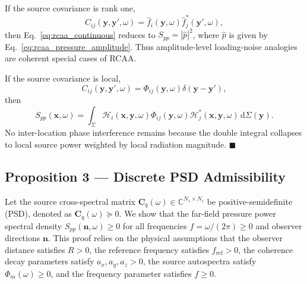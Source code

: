 \documentclass[11pt]{article}
\newcommand{\dd}{\,\mathrm{d}}
\newcommand{\vect}[1]{\bm{#1}}
\newcommand{\mat}[1]{\bm{#1}}
\begin{document}
If the source covariance is rank one,
\begin{equation}
    C_{ij}(\vect{y},\vect{y}',\omega)
    =
    \hat f_i(\vect{y},\omega)
    \hat f_j^*(\vect{y}',\omega),
\end{equation}
then Eq.~\ref{eq:rcaa_continuous} reduces to $S_{pp}=|\hat p|^2$, where $\hat p$ is given by Eq.~\ref{eq:rcaa_pressure_amplitude}. Thus amplitude-level loading-noise analogies are coherent special cases of RCAA.

If the source covariance is local,
\begin{equation}
    C_{ij}(\vect{y},\vect{y}',\omega)
    =
    \Phi_{ij}(\vect{y},\omega)\delta(\vect{y}-\vect{y}'),
\end{equation}
then
\begin{equation}
    S_{pp}(\vect{x},\omega)
    =
    \int_{\Sigma}
    \mathcal H_i(\vect{x},\vect{y},\omega)
    \Phi_{ij}(\vect{y},\omega)
    \mathcal H_j^*(\vect{x},\vect{y},\omega)
    \dd\Sigma(\vect{y}).
\end{equation}
No inter-location phase interference remains because the double integral collapses to local source power weighted by local radiation magnitude. $\blacksquare$

\subsection{Proposition 3 --- Discrete PSD Admissibility}

Let the source cross-spectral matrix $\mat{C}_q(\omega) \in \mathbb{C}^{N_s \times N_s}$ be positive-semidefinite (PSD), denoted as $\mat{C}_q(\omega) \succeq 0$. We show that the far-field pressure power spectral density $S_{pp}(\vect{n},\omega) \ge 0$ for all frequencies $f = \omega / (2\pi) \ge 0$ and observer directions $\vect{n}$. This proof relies on the physical assumptions that the observer distance satisfies $R > 0$, the reference frequency satisfies $f_{\mathrm{ref}} > 0$, the coherence decay parameters satisfy $a_x, a_y, a_z > 0$, the source autospectra satisfy $\Phi_m(\omega) \ge 0$, and the frequency parameter satisfies $f \ge 0$.
\end{document}

